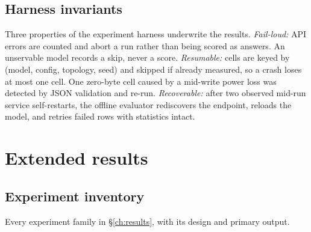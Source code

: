 \subsection{Harness invariants}
Three properties of the experiment harness underwrite the results.
\emph{Fail-loud:} API errors are counted and abort a run rather than being
scored as answers. An unservable model records a skip, never a score.
\emph{Resumable:} cells are keyed by (model, config, topology, seed) and
skipped if already measured, so a crash loses at most one cell. One
zero-byte cell caused by a mid-write power loss was detected by JSON
validation and re-run.
\emph{Recoverable:} after two observed mid-run service self-restarts, the
offline evaluator rediscovers the endpoint, reloads the model, and retries
failed rows with statistics intact.

\section{Extended results}\label{app:tables}

\subsection{Experiment inventory}
Every experiment family in \S\ref{ch:results}, with its design and primary output.

